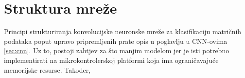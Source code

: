 \section{Struktura mreže}

Principi strukturiranja konvolucijske neuronske mreže za klasifikaciju matričnih podataka
poput upravo pripremljenih prate opis u poglavlju u CNN-ovima \ref{sec:cnn}.
Uz to, postoji zahtjev za što manjim modelom jer je isti potrebno implementirati na 
mikrokontrolerskoj platformi koja ima ograničavajuće memorijske resurse. Također, 
